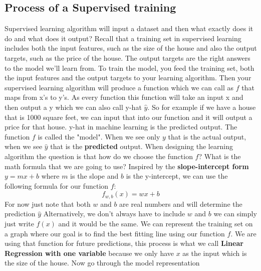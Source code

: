 \subsection{Process of a Supervised training}
Supervised learning algorithm will input a dataset and then what exactly does it do and what does it output?
Recall that a training set in supervised learning includes both the input features, such as the size of the house and also the output targets, such as the price of the house. The output targets are the right answers to the model we'll learn from.
To train the model, you feed the training set, both the input features and the output targets to your learning algorithm. Then your supervised learning algorithm will produce a function which we can call as $f$ that maps from x's to y's.
As every function this function will take an input x and then output a y which we can also call y-hat $\hat{y}$. So for example if we have a house that is 1000 square feet, we can input that into our function and it will output a price for that house.
y-hat in machine learning is the predicted output.
The function $f$ is called the "model". When we see only $y$ that is the actual output, when we see $\hat{y}$ that is the \textbf{predicted} output.
When designing the learning algorithm the question is that how do we choose the function $f$? What is the math formula that we are going to use?
Inspired by the \textbf{slope-intercept form} $y=mx+b$ where $m$ is the slope and $b$ is the y-intercept, we can use the following formula for our function $f$:
$$ f_{w,b}(x) = wx + b $$
For now just note that both $w$ and $b$ are real numbers and will determine the prediction $\hat{y}$
Alternatively, we don't always have to include $w$ and $b$ we can simply just write $f(x)$ and it would be the same.
We can represent the training set on a graph where our goal is to find the best fitting line using our function $f$.
We are using that function for future predictions, this process is what we call \textbf{Linear Regression with one variable} because we only have $x$ as the input which is the size of the house.
Now go through the model representation

